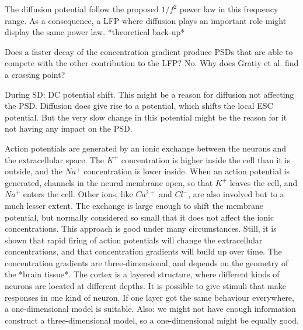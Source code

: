 \documentclass{article}
\begin{document}
The diffusion potential follow the proposed  $1/f^2$ power law in this frequency range. As a consequence, a LFP where diffusion plays an important role might display the same power law.  *theoretical back-up*

Does a faster decay of the concentration gradient produce PSDs that are able to compete with the other contribution to the LFP? No. Why does Gratiy et al. find a crossing point? 


During SD: DC potential shift. This might be a reason for diffusion not affecting the PSD. Diffusion does give rise to a potential, which shifts the local ESC potential. But the very slow change in this potential might be the reason for it not having any impact on the PSD.


Action potentials are generated by an ionic exchange between the neurons and the extracellular space. The $K^+$ concentration is higher inside the cell than it is outside, and the $Na^+$ concentration is lower inside. When an action potential is generated,  channels in the neural membrane open, so that $K^+$ leaves the cell, and $Na^+$ enters the cell. Other ions, like $Ca^{2+}$ and $Cl^-$, are also involved but to a much lesser extent. The exchange is large enough to shift the membrane potential, but normally considered so small that it does not affect the ionic concentrations. This approach is good under many circumstances. Still, it is shown that rapid firing of action potentials will change the extracellular concentrations, and that concentration gradients will build up over time. The concentration gradients are three-dimensional, and depends on the geometry of the *brain tissue*.  The cortex is a layered structure, where different kinds of neurons are located at different depths. It is possible to give stimuli that make responses in one kind of neuron. If one layer got the same behaviour everywhere, a one-dimensional model is suitable. Also: we might not have enough information construct a three-dimensional model, so a one-dimensional might be equally good. 
\end{document}
